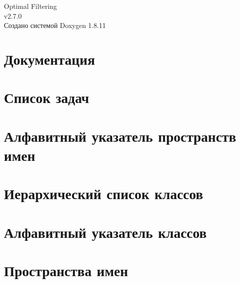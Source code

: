 \documentclass[twoside]{book}
\newcommand{\+}{\discretionary{\mbox{\scriptsize$\hookleftarrow$}}{}{}}
\newcommand{\clearemptydoublepage}{%
  \newpage{\pagestyle{empty}\cleardoublepage}%
}
\begin{document}
\hypersetup{pageanchor=false,
             bookmarksnumbered=true,
             pdfencoding=unicode
            }
\begin{titlepage}
\vspace*{7cm}
\begin{center}%
{\Large Optimal Filtering \\[1ex]\large v2.\+7.\+0 }\\
\vspace*{1cm}
{\large Создано системой Doxygen 1.8.11}\\
\end{center}
\end{titlepage}
\clearemptydoublepage
\tableofcontents
\clearemptydoublepage
{}
\hypersetup{pageanchor=true}

\chapter{Документация}
\label{index}\hypertarget{index}{}
\chapter{Список задач}
\label{todo}
\hypertarget{todo}{}

\chapter{Алфавитный указатель пространств имен}

\chapter{Иерархический список классов}

\chapter{Алфавитный указатель классов}

\chapter{Пространства имен}













\end{document}
